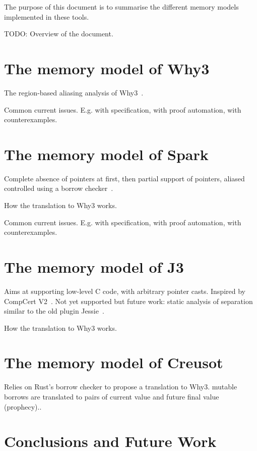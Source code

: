 \documentclass[a4paper,twoside]{article}
\begin{document}
The purpose of this document is to summarise the different memory models
implemented in these tools.


TODO: Overview of the document.

\section{The memory model of Why3}

The region-based aliasing analysis of Why3~\cite{gondelman16reg}.

Common current issues. E.g. with specification, with proof automation, with
counterexamples.

\section{The memory model of Spark}

Complete absence of pointers at first, then partial support of pointers, aliased
controlled using a borrow checker~\cite{dross20cav,jaloyan20icfem}.

How the translation to Why3 works.

Common current issues. E.g. with specification, with proof automation, with
counterexamples.

\section{The memory model of J3}

Aims at supporting low-level C code, with arbitrary pointer casts. Inspired by
CompCert V2~\cite{leroy12rr}. Not yet supported but future work: static analysis
of separation similar to the old plugin
Jessie~\cite{hubert2008these,hubert07hav}.

How the translation to Why3 works.

\section{The memory model of Creusot}

Relies on Rust's borrow checker to propose a translation to Why3. mutable
borrows are translated to pairs of current value and future final value
(prophecy).\cite{denis23phd,denis22icfem,matsushita22pldi}.

\section{Conclusions and Future Work}
\end{document}
